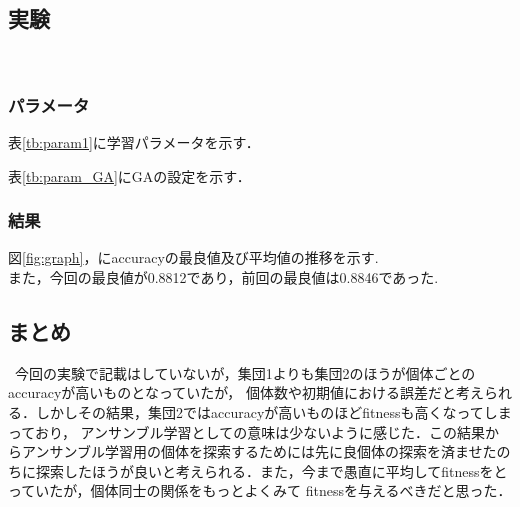 \documentclass[twocolumn]{jarticle}     %
\begin{document}
\subsection{実験}　
\subsubsection{パラメータ}
表\ref{tb:param1}に学習パラメータを示す．
\begin{table}[h]
	\centering
	\caption{学習パラメータ\label{tb:param1}}
\end{table}
 表\ref{tb:param_GA}にGAの設定を示す．
\begin{table}[h]
	\centering
	\caption{実験パラメータ\label{tb:param_GA}}
\end{table}
\subsubsection{結果}
図\ref{fig:graph}，にaccuracyの最良値及び平均値の推移を示す.\\

また，今回の最良値が0.8812であり，前回の最良値は0.8846であった.


\subsection{まとめ}
\ 今回の実験で記載はしていないが，集団1よりも集団2のほうが個体ごとのaccuracyが高いものとなっていたが，
個体数や初期値における誤差だと考えられる．しかしその結果，集団2ではaccuracyが高いものほどfitnessも高くなってしまっており，
アンサンブル学習としての意味は少ないように感じた．この結果からアンサンブル学習用の個体を探索するためには先に良個体の探索を済ませたのちに探索したほうが良いと考えられる．また，今まで愚直に平均してfitnessをとっていたが，個体同士の関係をもっとよくみて
fitnessを与えるべきだと思った．
\end{document}
